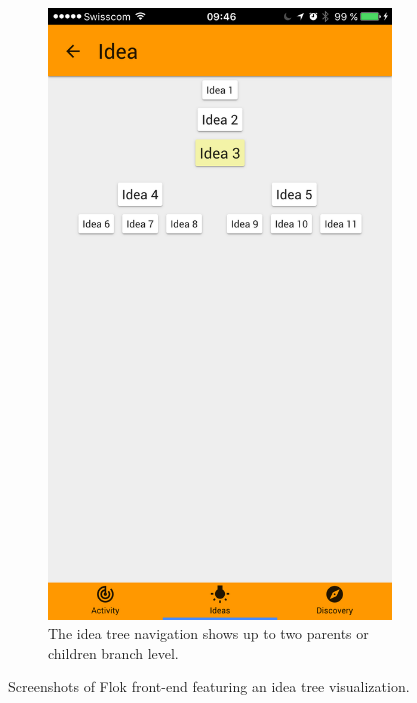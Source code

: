 \documentclass[a4paper,12pt, oneside]{article}
\begin{document}
\begin{figure}[!htb]
\begin{subfigure}[t]{.32\textwidth}
        \includegraphics[width=\textwidth]{images/branches_navigation.png}
        \caption{The idea tree navigation shows up to two parents or children branch level.}
    \end{subfigure}
    \hfill\null
    \caption{Screenshots of Flok front-end featuring an idea tree visualization.}
    \label{fig.branches}
\end{figure}
\end{document}
